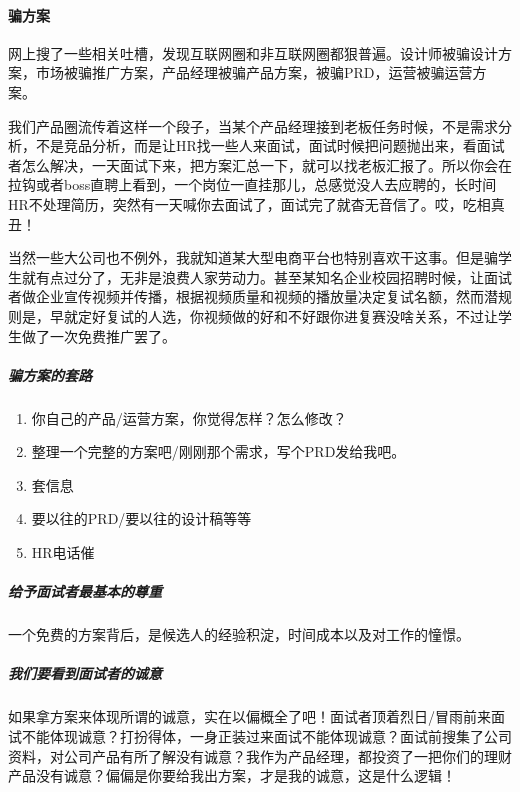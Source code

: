 \documentclass[letterpaper,11pt,english]{sphinxmanual}
\begin{document}
\paragraph{骗方案}
\label{\detokenize{chapter_interview/interviewer:id7}}
网上搜了一些相关吐槽，发现互联网圈和非互联网圈都狠普遍。设计师被骗设计方案，市场被骗推广方案，产品经理被骗产品方案，被骗PRD，运营被骗运营方案。

我们产品圈流传着这样一个段子，当某个产品经理接到老板任务时候，不是需求分析，不是竞品分析，而是让HR找一些人来面试，面试时候把问题抛出来，看面试者怎么解决，一天面试下来，把方案汇总一下，就可以找老板汇报了。所以你会在拉钩或者boss直聘上看到，一个岗位一直挂那儿，总感觉没人去应聘的，长时间HR不处理简历，突然有一天喊你去面试了，面试完了就杳无音信了。哎，吃相真丑！

当然一些大公司也不例外，我就知道某大型电商平台也特别喜欢干这事。但是骗学生就有点过分了，无非是浪费人家劳动力。甚至某知名企业校园招聘时候，让面试者做企业宣传视频并传播，根据视频质量和视频的播放量决定复试名额，然而潜规则是，早就定好复试的人选，你视频做的好和不好跟你进复赛没啥关系，不过让学生做了一次免费推广罢了。


\subparagraph{骗方案的套路}
\label{\detokenize{chapter_interview/interviewer:id8}}\begin{enumerate}
%
\item {} 
你自己的产品/运营方案，你觉得怎样？怎么修改？

\item {} 
整理一个完整的方案吧/刚刚那个需求，写个PRD发给我吧。

\item {} 
套信息

\item {} 
要以往的PRD/要以往的设计稿等等

\item {} 
HR电话催

\end{enumerate}


\subparagraph{给予面试者最基本的尊重}
\label{\detokenize{chapter_interview/interviewer:id9}}
一个免费的方案背后，是候选人的经验积淀，时间成本以及对工作的憧憬。


\subparagraph{我们要看到面试者的诚意}
\label{\detokenize{chapter_interview/interviewer:id10}}
如果拿方案来体现所谓的诚意，实在以偏概全了吧！面试者顶着烈日/冒雨前来面试不能体现诚意？打扮得体，一身正装过来面试不能体现诚意？面试前搜集了公司资料，对公司产品有所了解没有诚意？我作为产品经理，都投资了一把你们的理财产品没有诚意？偏偏是你要给我出方案，才是我的诚意，这是什么逻辑！
\end{document}
